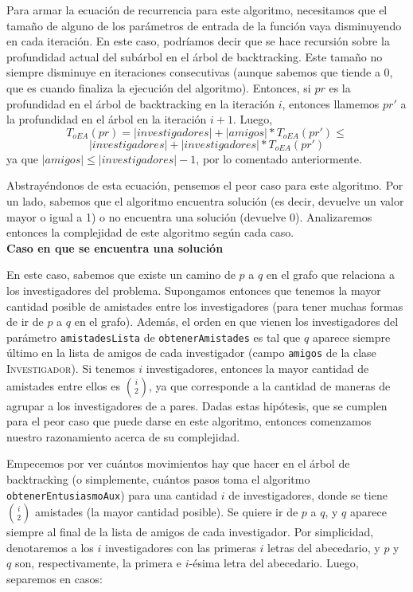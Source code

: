 \documentclass[12pt, a4paper,english,spanish]{article}
\begin{document}
\begin{itemize}
Para armar la ecuaci\'on de recurrencia para este algoritmo, necesitamos que el tama\~no de alguno de los par\'ametros de entrada de la funci\'on vaya disminuyendo en cada iteraci\'on. En este caso, podr\'iamos decir que se hace recursi\'on sobre la profundidad actual del sub\'arbol en el \'arbol de backtracking. Este tama\~no no siempre disminuye en iteraciones consecutivas (aunque sabemos que tiende a 0, que es cuando finaliza la ejecuci\'on del algoritmo). Entonces, si $pr$ es la profundidad en el \'arbol de backtracking en la iteraci\'on $i$, entonces llamemos $pr'$ a la profundidad en el \'arbol en la iteraci\'on $i+1$. Luego, $$T_{oEA}(pr) = |investigadores| + |amigos| * T_{oEA}(pr') \leq$$ $$ |investigadores| + |investigadores| * T_{oEA}(pr')$$ ya que $|amigos| \leq |investigadores|-1$, por lo comentado anteriormente. 

Abstray\'endonos de esta ecuaci\'on, pensemos el peor caso para este algoritmo. Por un lado, sabemos que el algoritmo encuentra soluci\'on (es decir, devuelve un valor mayor o igual a 1) o no encuentra una soluci\'on (devuelve 0). Analizaremos entonces la complejidad de este algoritmo seg\'un cada caso. \\    

\textbf{Caso en que se encuentra una soluci\'on}

En este caso, sabemos que existe un camino de $p$ a $q$ en el grafo que relaciona a los investigadores del problema. Supongamos entonces que tenemos la mayor cantidad posible de amistades entre los investigadores (para tener muchas formas de ir de $p$ a $q$ en el grafo). Adem\'as, el orden en que vienen los investigadores del par\'ametro \texttt{amistadesLista} de \texttt{obtenerAmistades} es tal que $q$ aparece siempre \'ultimo en la lista de amigos de cada investigador (campo \texttt{amigos} de la clase \textsc{Investigador}). Si tenemos $i$ investigadores, entonces la mayor cantidad de amistades entre ellos es $\binom{i}{2}$, ya que corresponde a la cantidad de maneras de agrupar a los investigadores de a pares. Dadas estas hip\'otesis, que se cumplen para el peor caso que puede darse en este algoritmo, entonces comenzamos nuestro razonamiento acerca de su complejidad. 

Empecemos por ver cu\'antos movimientos hay que hacer en el \'arbol de backtracking (o simplemente, cu\'antos pasos toma el algoritmo \texttt{obtenerEntusiasmoAux}) para una cantidad $i$ de investigadores, donde se tiene $\binom{i}{2}$ amistades (la mayor cantidad posible). Se quiere ir de $p$ a $q$, y $q$ aparece siempre al final de la lista de amigos de cada investigador. Por simplicidad, denotaremos a los $i$ investigadores con las primeras $i$ letras del abecedario, y $p$ y $q$ son, respectivamente, la primera e $i$-\'esima letra del abecedario. Luego, separemos en casos:


\end{itemize}
\end{document}
